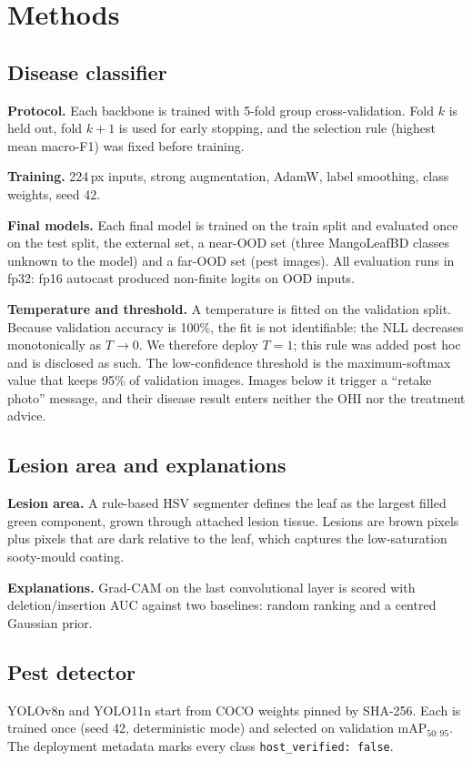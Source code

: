 \documentclass[conference]{IEEEtran}
\begin{document}
\section{Methods}
\subsection{Disease classifier}\label{sec:disease}
\textbf{Protocol.} Each backbone is trained with 5-fold group cross-validation. Fold $k$ is held out, fold $k{+}1$
is used for early stopping, and the selection rule (highest mean macro-F1) was fixed before training.

\textbf{Training.} 224\,px inputs, strong augmentation, AdamW, label smoothing, class weights, seed 42.

\textbf{Final models.} Each final model is trained on the train split and evaluated once on the test split, the
external set, a near-OOD set (three MangoLeafBD classes unknown to the model) and a far-OOD set (pest images). All
evaluation runs in fp32: fp16 autocast produced non-finite logits on OOD inputs.

\textbf{Temperature and threshold.} A temperature is fitted on the validation split. Because validation accuracy is
100\%, the fit is not identifiable: the NLL decreases monotonically as $T\to0$. We therefore deploy $T{=}1$; this
rule was added post hoc and is disclosed as such. The low-confidence threshold is the maximum-softmax value that
keeps 95\% of validation images. Images below it trigger a ``retake photo'' message, and their disease result
enters neither the OHI nor the treatment advice.

\subsection{Lesion area and explanations}
\textbf{Lesion area.} A rule-based HSV segmenter defines the leaf as the largest filled green component, grown
through attached lesion tissue. Lesions are brown pixels plus pixels that are dark relative to the leaf, which
captures the low-saturation sooty-mould coating.

\textbf{Explanations.} Grad-CAM \cite{selvaraju2017gradcam} on the last convolutional layer is scored with
deletion/insertion AUC \cite{petsiuk2018rise} against two baselines: random ranking and a centred Gaussian prior.

\subsection{Pest detector}
YOLOv8n and YOLO11n \cite{jocher2023ultralytics} start from COCO weights pinned by SHA-256. Each is trained once
(seed 42, deterministic mode) and selected on validation mAP$_{50:95}$. The deployment metadata marks every class
\texttt{host\_verified: false}.
\end{document}
